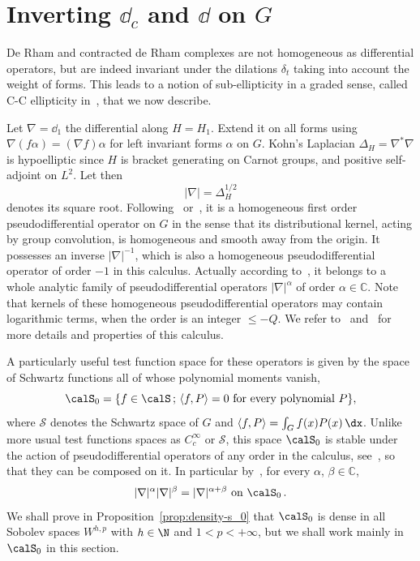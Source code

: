 \section{Inverting \texorpdfstring{$\dd_c$}{dc} and \texorpdfstring{$\dd$}{d} on \texorpdfstring{$G$}{G}}\label{sec:inverting-d-d_c}

De Rham and contracted de Rham complexes are not homogeneous as differential operators, but are indeed invariant under the dilations $\delta_t$ taking into account the weight of forms. This leads to a notion of sub-ellipticity in a graded sense, called C-C ellipticity in~\cite{Rumin_CRAS_1999, Rumin_TSG}, that we now describe.

Let $\nabla = \dd_1$ the differential along $H = H_1$. Extend it on all forms using $\nabla (f \alpha) = (\nabla f) \alpha$ for left invariant forms $\alpha$ on $G$. Kohn's Laplacian $\Delta_H = \nabla^* \nabla$ is hypoelliptic since $H$ is bracket generating on Carnot groups, and positive self-adjoint on $L^2$. Let then
\[
|\nabla| = \Delta_H^{1/2}
\]
denotes its square root. Following~\cite[Section~3]{Folland_1975} or~\cite{CGGP}, it is a homogeneous first order pseudodifferential operator on $G$ in the sense that its distributional kernel, acting by group convolution, is homogeneous and smooth away from the origin. It possesses an inverse $|\nabla|^{-1}$, which is also a homogeneous pseudodifferential operator of order $-1$ in this calculus. Actually according to~\cite[Theorem~3.15]{Folland_1975}, it belongs to a whole analytic family of pseudodifferential operators $|\nabla|^\alpha$ of order $\alpha \in \mathbb{C}$. Note that kernels of these homogeneous pseudodifferential operators may contain logarithmic terms, when the order is an integer $\leq -Q$. We refer to~\cite{CGGP} and~\cite[Section~1]{Folland_1975} for more details and properties of this calculus.

A particularly useful test function space for these operators is given by the space of Schwartz functions all of whose polynomial moments vanish,
\begin{equation}\label{eq:9}
\calS_0=\{f\in\calS\,;\,\langle f,P\rangle=0 \text{ for every polynomial }P\},
\end{equation}
where $\mathcal{S}$ denotes the Schwartz space of $G$ and $\langle f,P\rangle=\int_Gf(x)P(x)\,\dx$. Unlike more usual test functions spaces as $C^\infty_c$ or $\mathcal{S}$, this space $\calS_0$ is stable under the action of pseudodifferential operators of any order in the calculus, see~\cite[Proposition~2.2]{CGGP}, so that they can be composed on it. In particular by~\cite[Theorem~3.15]{Folland_1975}, for every $\alpha$, $\beta \in \mathbb{C}$,
\begin{equation}\label{eq:10}
|\nabla|^\alpha |\nabla|^{\beta} = |\nabla|^{\alpha+\beta} \
\mathrm{on} \ \calS_0 \,.
\end{equation}
We shall prove in Proposition~\ref{prop:density-s_0} that $\calS_0$ is dense in all Sobolev spaces $W^{h,p}$ with $h \in \N$ and $1< p< +\infty$, but we shall work mainly in $\calS_0$ in this section.


